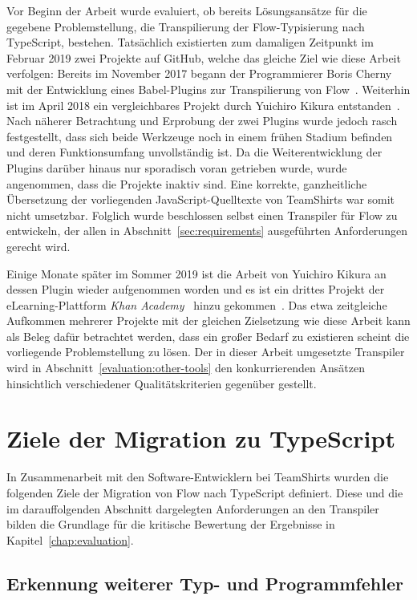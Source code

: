 Vor Beginn der Arbeit wurde evaluiert, ob bereits Lösungsansätze für die gegebene Problemstellung, die Transpilierung der Flow-Typisierung nach TypeScript, bestehen. Tatsächlich existierten zum damaligen Zeitpunkt im Februar 2019 zwei Projekte auf GitHub, welche das gleiche Ziel wie diese Arbeit verfolgen: Bereits im November 2017 begann der Programmierer Boris Cherny mit der Entwicklung eines Babel-Plugins zur Transpilierung von Flow~\autocite{CHERNY:FLOW_TO_TS}. Weiterhin ist im April 2018 ein vergleichbares Projekt durch Yuichiro Kikura entstanden~\autocite{KIKURA:FLOW_TO_TS}. Nach näherer Betrachtung und Erprobung der zwei Plugins wurde jedoch rasch festgestellt, dass sich beide Werkzeuge noch in einem frühen Stadium befinden und deren Funktionsumfang unvollständig ist. Da die Weiterentwicklung der Plugins darüber hinaus nur sporadisch voran getrieben wurde, wurde angenommen, dass die Projekte inaktiv sind. Eine korrekte, ganzheitliche Übersetzung der vorliegenden JavaScript-Quelltexte von TeamShirts war somit nicht umsetzbar. Folglich wurde beschlossen selbst einen Transpiler für Flow zu entwickeln, der allen in Abschnitt~\ref{sec:requirements} ausgeführten Anforderungen gerecht wird.

Einige Monate später im Sommer 2019 ist die Arbeit von Yuichiro Kikura an dessen Plugin wieder aufgenommen worden und es ist ein drittes Projekt der eLearning-Plattform \textit{Khan Academy}~\autocite{KHAN_ACADEMY} hinzu gekommen~\autocite{KHAN:FLOW_TO_TS}. Das etwa zeitgleiche Aufkommen mehrerer Projekte mit der gleichen Zielsetzung wie diese Arbeit kann als Beleg dafür betrachtet werden, dass ein großer Bedarf zu existieren scheint die vorliegende Problemstellung zu lösen. Der in dieser Arbeit umgesetzte Transpiler wird in Abschnitt~\ref{evaluation:other-tools} den konkurrierenden Ansätzen hinsichtlich verschiedener Qualitätskriterien gegenüber gestellt.

\section{Ziele der Migration zu TypeScript}
\label{analysis:goals}

In Zusammenarbeit mit den Software-Entwicklern bei TeamShirts wurden die folgenden Ziele der Migration von Flow nach TypeScript definiert. Diese und die im darauffolgenden Abschnitt dargelegten Anforderungen an den Transpiler bilden die Grundlage für die kritische Bewertung der Ergebnisse in Kapitel~\ref{chap:evaluation}.

\subsection{Erkennung weiterer Typ- und Programmfehler}

